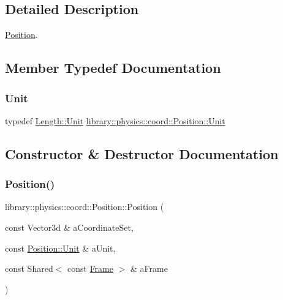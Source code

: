 \subsection{Detailed Description}
\hyperlink{classlibrary_1_1physics_1_1coord_1_1_position}{Position}. 

\subsection{Member Typedef Documentation}
\mbox{\label{classlibrary_1_1physics_1_1coord_1_1_position_aa89cc8ffbcb33e1b347e51b179183613}} 
\subsubsection{\texorpdfstring{Unit}{Unit}}
{\footnotesize\ttfamily typedef \hyperlink{classlibrary_1_1physics_1_1units_1_1_length_a3b8b39cd245cf6b19dc34459baeccb18}{Length\+::\+Unit} \hyperlink{classlibrary_1_1physics_1_1units_1_1_length_a3b8b39cd245cf6b19dc34459baeccb18}{library\+::physics\+::coord\+::\+Position\+::\+Unit}}



\subsection{Constructor \& Destructor Documentation}
\mbox{\label{classlibrary_1_1physics_1_1coord_1_1_position_a68bead4a5057939ee5b6e77d2a8aa446}} 
\subsubsection{\texorpdfstring{Position()}{Position()}\hspace{0.1cm}{\footnotesize\ttfamily [1/2]}}
{\footnotesize\ttfamily library\+::physics\+::coord\+::\+Position\+::\+Position (\begin{DoxyParamCaption}\item[{const Vector3d \&}]{a\+Coordinate\+Set,  }\item[{const \hyperlink{classlibrary_1_1physics_1_1units_1_1_length_a3b8b39cd245cf6b19dc34459baeccb18}{Position\+::\+Unit} \&}]{a\+Unit,  }\item[{const Shared$<$ const \hyperlink{classlibrary_1_1physics_1_1coord_1_1_frame}{Frame} $>$ \&}]{a\+Frame }\end{DoxyParamCaption})}

